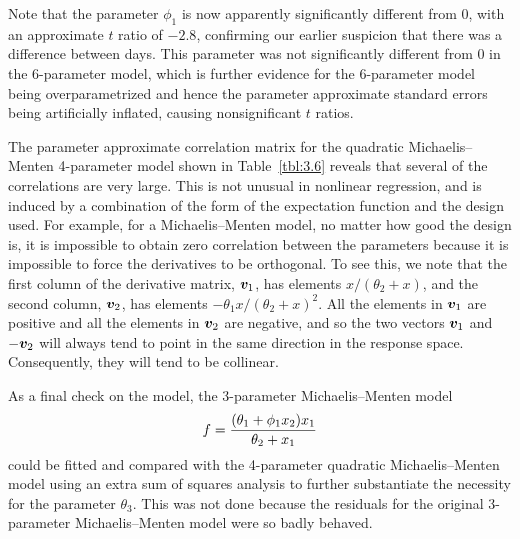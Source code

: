 Note that the parameter $\phi_{1}$ is now apparently
significantly different from 0, with an approximate
$t$ ratio of $-2.8$, confirming our earlier
suspicion that there was a difference between days.
This parameter was not significantly different from 0 in the
6-parameter model, which is further evidence for the 6-parameter
model being overparametrized and hence the parameter
approximate standard errors being artificially inflated, causing
nonsignificant $t$ ratios.

The parameter approximate correlation matrix for the quadratic
Michaelis--Menten 4-parameter model shown in
Table~\ref{tbl:3.6}
reveals that several of the correlations are very large.
This is not unusual in nonlinear regression, and is induced by a
combination of the form of the expectation function and the
design used.
For example, for a Michaelis--Menten model, no matter how good the
design is, it is impossible to obtain zero correlation between
the parameters because it is impossible to force the derivatives
to be orthogonal.
To see this, we note that the first column of
the derivative matrix, ${\boldsymbol v}_{1}$, has elements
$x /( \theta_2 + x)$, and the second column,
${\boldsymbol v}_{2}$, has elements
${- \theta_1 x} / ( \theta_2 + x )^{2}$.
All the elements in ${\boldsymbol v}_{1}$ are positive and all the
elements in ${\boldsymbol v}_{2}$ are negative, and so the two vectors
${\boldsymbol v}_{1}$ and
$ - {\boldsymbol v}_{2}$ will always tend to point in the same
direction in the response space.
Consequently, they will tend to be collinear.

As a final check on the model, the 3-parameter Michaelis--Menten
model
$$
f = {( \theta_1 + \phi_1 x_2 ) x_1  \over  \theta_2 + x_1}
$$
could be fitted and compared with the
4-parameter quadratic Michaelis--Menten model using an extra sum of
squares analysis to further substantiate the necessity for the parameter
$\theta_{3}$.
This was not done because the residuals for the original 3-parameter
Michaelis--Menten model were so badly behaved.

